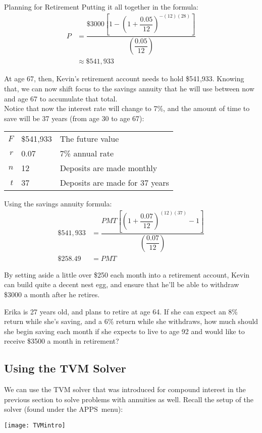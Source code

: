 \begin{example}[https://www.youtube.com/watch?v=mvrekziv55I&list=PLfmpjsIzhztsZtnb7HnXrQ8SLoiOCIcAM&index=31]{Planning for Retirement}
Putting it all together in the formula:
\begin{align*}
P &= \dfrac{\$3000\left[1-\left(1+\dfrac{0.05}{12}\right)^{-(12)(28)}\right]}{\left(\dfrac{0.05}{12}\right)}\\
&\approx \$541,933
\end{align*}

At age 67, then, Kevin's retirement account needs to hold \$541,933.  Knowing that, we can now shift focus to the savings annuity that he will use between now and age 67 to accumulate that total.\\

Notice that now the interest rate will change to 7\%, and the amount of time to save will be 37 years (from age 30 to age 67):
\begin{center}
\begin{tabular}{r l l}
$F$ & \$541,933 & The future value\\
$r$ & 0.07 & 7\% annual rate\\
$n$ & 12 & Deposits are made monthly\\
$t$ & 37 & Deposits are made for 37 years
\end{tabular}
\end{center}

Using the savings annuity formula:
\begin{align*}
\$541,933 &= \dfrac{PMT\left[\left(1+\dfrac{0.07}{12}\right)^{(12)(37)}-1\right]}{\left(\dfrac{0.07}{12}\right)}\\
\boxed{\$258.49} &= PMT
\end{align*}

By setting aside a little over \$250 each month into a retirement account, Kevin can build quite a decent nest egg, and ensure that he'll be able to withdraw \$3000 a month after he retires.
\end{example}

\begin{try}
Erika is 27 years old, and plans to retire at age 64.  If she can expect an 8\% return while she's saving, and a 6\% return while she withdraws, how much should she begin saving each month if she expects to live to age 92 and would like to receive \$3500 a month in retirement?
\end{try}

\vfill
\pagebreak

\subsection{Using the TVM Solver}
We can use the TVM solver that was introduced for compound interest in the previous section to solve problems with annuities as well.  Recall the setup of the solver (found under the $\boxed{\textrm{APPS}}$\ menu):
\begin{center}
\texttt{[image: TVMintro]}
\end{center}

